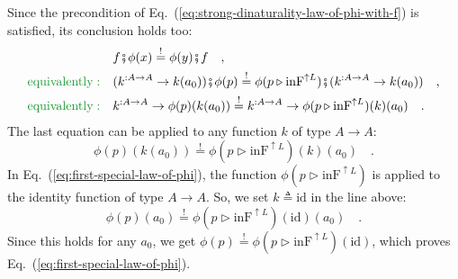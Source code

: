 Since the precondition of Eq.~(\ref{eq:strong-dinaturality-law-of-phi-with-f})
is satisfied, its conclusion holds too:
\begin{align*}
 & f\bef\phi(x)\overset{!}{=}\phi(y)\bef f\quad,\\
{\color{greenunder}\text{equivalently}:}\quad & (k^{:A\rightarrow A}\rightarrow k(a_{0}))\bef\phi(p)\overset{!}{=}\phi(p\triangleright\text{inF}^{\uparrow L})\bef(k^{:A\rightarrow A}\rightarrow k(a_{0}))\quad,\\
{\color{greenunder}\text{equivalently}:}\quad & k^{:A\rightarrow A}\rightarrow\phi(p)(k(a_{0}))\overset{!}{=}k^{:A\rightarrow A}\rightarrow\phi(p\triangleright\text{inF}^{\uparrow L})(k)(a_{0})\quad.
\end{align*}
The last equation can be applied to any function $k$ of type $A\rightarrow A$:
\[
\phi(p)(k(a_{0}))\overset{!}{=}\phi(p\triangleright\text{inF}^{\uparrow L})(k)(a_{0})\quad.
\]
In Eq.~(\ref{eq:first-special-law-of-phi}), the function $\phi(p\triangleright\text{inF}^{\uparrow L})$
is applied to the identity function of type $A\rightarrow A$. So,
we set $k\triangleq\text{id}$ in the line above:
\[
\phi(p)(a_{0})\overset{!}{=}\phi(p\triangleright\text{inF}^{\uparrow L})(\text{id})(a_{0})\quad.
\]
Since this holds for any $a_{0}$, we get $\phi(p)\overset{!}{=}\phi(p\triangleright\text{inF}^{\uparrow L})(\text{id})$,
which proves Eq.~(\ref{eq:first-special-law-of-phi}).

